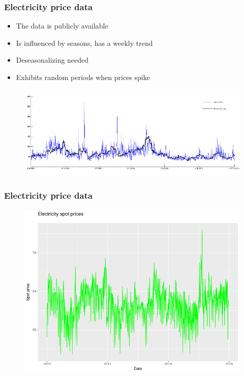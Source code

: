 \documentclass{beamer}
\begin{document}

\begin{frame}
\frametitle{Electricity price data}

\begin{itemize}
\item The data is publicly available
\item Is influenced by seasons, has a weekly trend
\item Deseasonalizing needed
\item Exhibits random periods when prices spike
\end{itemize}

\begin{figure}
\includegraphics[width=0.8\linewidth]{electricity_price.jpg}
\end{figure}

\end{frame}

\begin{frame}
\frametitle{Electricity price data}

\begin{figure}
\includegraphics[width=0.85\linewidth]{dnevne_cene_2013_2015.png}
\end{figure}

\end{frame}
\end{document}

